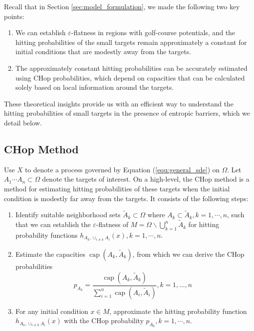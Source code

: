 \documentclass[english, aip, jcp, priprint, graphicx,floatfix]{revtex4-1}
\theoremstyle{plain}
\theoremstyle{definition}
\theoremstyle{plain}
\begin{document}
Recall that in Section \ref{sec:model_formulation}, we made the following two key points:

\begin{enumerate}[noitemsep]
    \item We can establish $\varepsilon$-flatness in regions with golf-course potentials, and the hitting probabilities of the small targets remain approximately a constant for initial conditions that are modestly away from the targets. 
    \item The approximately constant hitting probabilities can be accurately estimated using CHop probabilities, which depend on capacities that can be calculated solely based on local information around the targets.
\end{enumerate}

These theoretical insights provide us with an efficient way to understand the hitting probabilities of small targets in the presence of entropic barriers, which we detail below.

\subsection{CHop Method}

Use $X$ to denote a process governed by Equation (\ref{equ:general_sde}) on $\Omega$.  Let $A_1\cdots A_n \subset \Omega$ denote the targets of interest.  On a high-level, the CHop method is a method for estimating hitting probabilities of these targets when the initial condition is modestly far away from the targets.  It consists of the following steps:

\begin{enumerate}[noitemsep]
    \item Identify suitable neighborhood sets $\tilde A_k \subset \Omega$ where $A_k \subset \tilde{A}_k, k=1, \cdots, n$, such that we can establish the $\varepsilon$-flatness of $M = \Omega \backslash \bigcup_{k = 1}^n \tilde{A}_k $ for hitting probability functions $h_{A_k,\cup_{i\neq k} A_i}(x), k=1, \cdots, n$.
    \item Estimate the capacities $\ensuremath{\operatorname{cap}} (A_k, \tilde{A}_k)$, from which we can derive the CHop probabilities
\begin{equation*}
p_{A_k} = \frac{\ensuremath{\operatorname{cap}} (A_k, \tilde{A}_k)}{\sum_{i = 1}^n \ensuremath{\operatorname{cap}} (A_i, \tilde{A}_i)}, k=1,\dots, n
\end{equation*} 
    \item For any initial condition $x \in M$, approximate the hitting probability function $h_{A_k,\cup_{i\neq k} A_i}(x)$ with the CHop probability $p_{A_k}, k=1, \cdots, n$.  
\end{enumerate}
\end{document}

